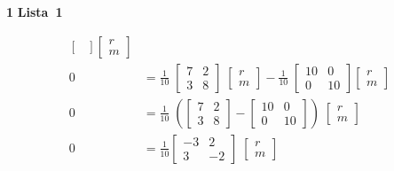 \documentclass{article}
\newcounter{exe-list}
\newenvironment{exe-list}
    {\begin{list}{(\alph{exe-list})}{\usecounter{exe-list}}}
    {\end{list}}
\newenvironment{exe}[2][Sala]
    {\bigskip\noindent\par\ifthenelse{\equal{#1}{}}%
        {\textbf{\LARGE #2}}%
        {\textbf{\LARGE #1~#2}}%
    \medskip\noindent\par}
    {\bigskip}
\begin{document}
\begin{exe}[Lista]{1}
\begin{exe-list}
\begin{align*}
\begin{bmatrix}
                    \end{bmatrix} \begin{bmatrix}
                        r \\ m
                    \end{bmatrix} \\
                0 &= \frac{1}{10} \; \begin{bmatrix}
                        7 & 2 \\
                        3 & 8
                    \end{bmatrix} \; \begin{bmatrix}
                        r \\ m
                    \end{bmatrix} - \frac{1}{10} \; \begin{bmatrix}
                        10 & 0 \\
                        0 & 10
                    \end{bmatrix} \begin{bmatrix}
                        r \\ m
                    \end{bmatrix} \\
                0 &= \frac{1}{10} \; \left(
                    \begin{bmatrix}
                        7 & 2 \\
                        3 & 8
                    \end{bmatrix} - \begin{bmatrix}
                        10 & 0 \\
                        0 & 10
                    \end{bmatrix}
                    \right) \; \begin{bmatrix}
                        r \\ m
                    \end{bmatrix} \\
                0 &= \frac{1}{10} \begin{bmatrix}
                        -3 & 2 \\
                        3 & -2
                    \end{bmatrix}
                    \; \begin{bmatrix}
                        r \\ m
                    \end{bmatrix} \\

\end{align*}
\end{exe-list}
\end{exe}
\end{document}
